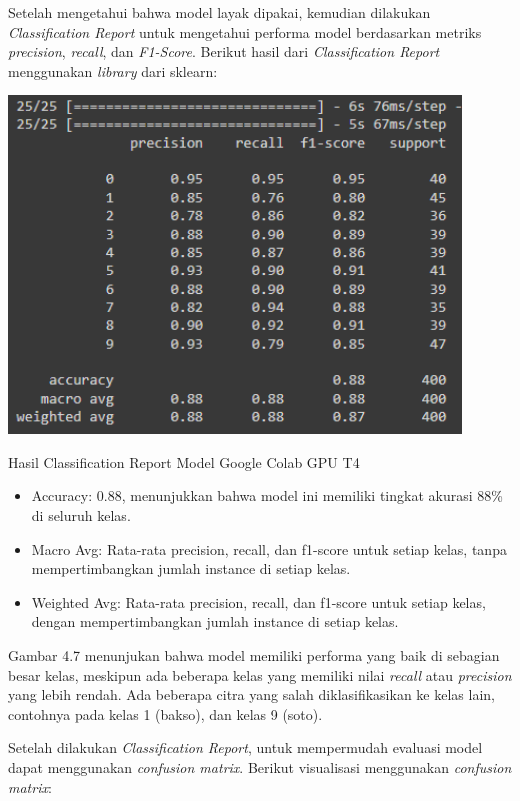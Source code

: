 Setelah mengetahui bahwa model layak dipakai, kemudian dilakukan \textit{
Classification Report} untuk mengetahui performa model berdasarkan metriks \textit{precision}, \textit{recall}, dan \textit{F1-Score}. Berikut hasil dari \textit{Classification Report} menggunakan \textit{library} dari sklearn:

\pagebreak

\begin{afigure}
    \includegraphics[width=0.9\textwidth, center]{images/classification-report.png}
    \caption{Hasil Classification Report Model Google Colab GPU T4}
    \label{fig:classification-report}
\end{afigure}


\begin{itemize}
    \item Accuracy: 0.88, menunjukkan bahwa model ini memiliki tingkat akurasi 88\% di seluruh kelas.
    \item Macro Avg: Rata-rata precision, recall, dan f1-score untuk setiap kelas, tanpa mempertimbangkan jumlah instance di setiap kelas.
    \item Weighted Avg: Rata-rata precision, recall, dan f1-score untuk setiap kelas, dengan mempertimbangkan jumlah instance di setiap kelas.
\end{itemize}

Gambar 4.7 menunjukan bahwa model memiliki performa yang baik di sebagian besar kelas, meskipun ada beberapa kelas yang memiliki nilai \textit{recall} atau \textit{precision} yang lebih rendah. Ada beberapa citra yang salah diklasifikasikan ke kelas lain, contohnya pada kelas 1 (bakso), dan kelas 9 (soto).

Setelah dilakukan \textit{Classification Report}, untuk mempermudah evaluasi model dapat menggunakan \textit{confusion matrix}. Berikut visualisasi menggunakan \textit{confusion matrix}:

